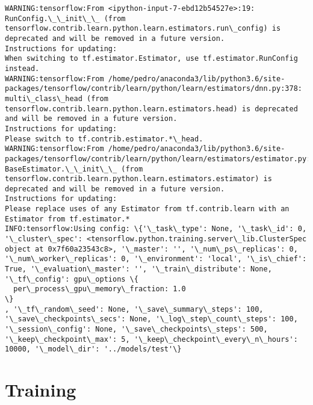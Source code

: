 \documentclass[11pt]{article}
\begin{document}
    \begin{Verbatim}[commandchars=\\\{\}]
WARNING:tensorflow:From <ipython-input-7-ebd12b54527e>:19: RunConfig.\_\_init\_\_ (from tensorflow.contrib.learn.python.learn.estimators.run\_config) is deprecated and will be removed in a future version.
Instructions for updating:
When switching to tf.estimator.Estimator, use tf.estimator.RunConfig instead.
WARNING:tensorflow:From /home/pedro/anaconda3/lib/python3.6/site-packages/tensorflow/contrib/learn/python/learn/estimators/dnn.py:378: multi\_class\_head (from tensorflow.contrib.learn.python.learn.estimators.head) is deprecated and will be removed in a future version.
Instructions for updating:
Please switch to tf.contrib.estimator.*\_head.
WARNING:tensorflow:From /home/pedro/anaconda3/lib/python3.6/site-packages/tensorflow/contrib/learn/python/learn/estimators/estimator.py:1179: BaseEstimator.\_\_init\_\_ (from tensorflow.contrib.learn.python.learn.estimators.estimator) is deprecated and will be removed in a future version.
Instructions for updating:
Please replace uses of any Estimator from tf.contrib.learn with an Estimator from tf.estimator.*
INFO:tensorflow:Using config: \{'\_task\_type': None, '\_task\_id': 0, '\_cluster\_spec': <tensorflow.python.training.server\_lib.ClusterSpec object at 0x7f60a23543c8>, '\_master': '', '\_num\_ps\_replicas': 0, '\_num\_worker\_replicas': 0, '\_environment': 'local', '\_is\_chief': True, '\_evaluation\_master': '', '\_train\_distribute': None, '\_tf\_config': gpu\_options \{
  per\_process\_gpu\_memory\_fraction: 1.0
\}
, '\_tf\_random\_seed': None, '\_save\_summary\_steps': 100, '\_save\_checkpoints\_secs': None, '\_log\_step\_count\_steps': 100, '\_session\_config': None, '\_save\_checkpoints\_steps': 500, '\_keep\_checkpoint\_max': 5, '\_keep\_checkpoint\_every\_n\_hours': 10000, '\_model\_dir': '../models/test'\}

    \end{Verbatim}

    \section{Training}\label{training}
\end{document}
